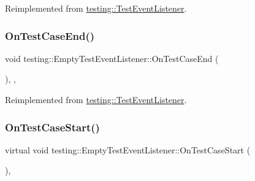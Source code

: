 Reimplemented from \mbox{\hyperlink{classtesting_1_1_test_event_listener_a6cada1572dde8010b94f6dd237ce52f4}{testing\+::\+Test\+Event\+Listener}}.

\mbox{\label{classtesting_1_1_empty_test_event_listener_abe05cc74c1081ed51e2c84b73013299e}} 
\subsubsection{\texorpdfstring{OnTestCaseEnd()}{OnTestCaseEnd()}\hspace{0.1cm}{\footnotesize\ttfamily [3/3]}}
{\footnotesize\ttfamily void testing\+::\+Empty\+Test\+Event\+Listener\+::\+On\+Test\+Case\+End (\begin{DoxyParamCaption}\item[{const \mbox{\hyperlink{classtesting_1_1_test_case}{Test\+Case}} \&}]{ }\end{DoxyParamCaption})\hspace{0.3cm}{\ttfamily [inline]}, {\ttfamily [override]}, {\ttfamily [virtual]}}



Reimplemented from \mbox{\hyperlink{classtesting_1_1_test_event_listener_a6cada1572dde8010b94f6dd237ce52f4}{testing\+::\+Test\+Event\+Listener}}.

\mbox{\label{classtesting_1_1_empty_test_event_listener_ae4707ed9cc7ace5241bc8ccc4051209b}} 
\subsubsection{\texorpdfstring{OnTestCaseStart()}{OnTestCaseStart()}\hspace{0.1cm}{\footnotesize\ttfamily [1/3]}}
{\footnotesize\ttfamily virtual void testing\+::\+Empty\+Test\+Event\+Listener\+::\+On\+Test\+Case\+Start (\begin{DoxyParamCaption}\item[{const \mbox{\hyperlink{classtesting_1_1_test_case}{Test\+Case}} \&}]{ }\end{DoxyParamCaption})\hspace{0.3cm}{\ttfamily [inline]}, {\ttfamily [virtual]}}



